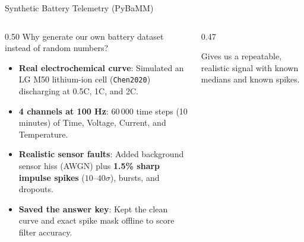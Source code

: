 \begin{frame}{Synthetic Battery Telemetry (PyBaMM)}
  \begin{columns}[t, onlytextwidth]
    \begin{column}{0.50\textwidth}
      \smalltext\compactitem
      Why generate our own battery dataset instead of random numbers?
      \begin{itemize}
        \item \textbf{Real electrochemical curve}: Simulated an LG M50 lithium-ion cell (\texttt{Chen2020}) discharging at 0.5C, 1C, and 2C.
        \item \textbf{4 channels at 100 Hz}: 60\,000 time steps (10 minutes) of Time, Voltage, Current, and Temperature.
        \item \textbf{Realistic sensor faults}: Added background sensor hiss (AWGN) plus \textbf{1.5\% sharp impulse spikes} ($10$--$40\sigma$), bursts, and dropouts.
        \item \textbf{Saved the answer key}: Kept the clean curve and exact spike mask offline to score filter accuracy.
      \end{itemize}
    \end{column}
    \begin{column}{0.47\textwidth}
      \begin{center}
      \end{center}
      \vskip1mm
      \begin{highlight}
        Gives us a repeatable, realistic signal with known medians and known spikes.
      \end{highlight}
    \end{column}
  \end{columns}
\end{frame}

